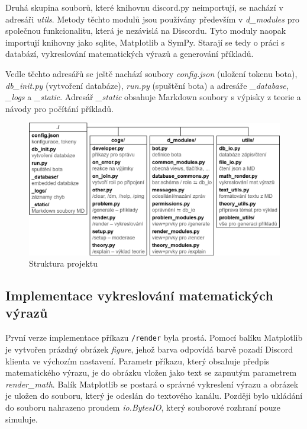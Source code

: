 \documentclass[FM]{tulthesis}
\begin{document}
	Druhá skupina souborů, které knihovnu discord.py neimportují, se nachází v adresáři \textit{utils}. Metody těchto modulů jsou používány především v \textit{d\_modules} pro společnou funkcionalitu, která je nezávislá na Discordu. Tyto moduly naopak importují knihovny jako sqlite, Matplotlib a SymPy. Starají se tedy o práci s databází, vykreslování matematických výrazů a generování příkladů. %
	
	Vedle těchto adresářů se ještě nachází soubory \textit{config.json} (uložení tokenu bota), \textit{db\_init.py} (vytvoření databáze), \textit{run.py} (spuštění bota) a adresáře \textit{\_database}, \textit{\_logs} a \textit{\_static}. Adresář \textit{\_static} obsahuje Markdown soubory s výpisky z teorie a návody pro počítání příkladů. %
	
	\begin{figure}[ht]
		\centering
		\includegraphics[width=\textwidth]{img/ProjectStructure}
		\caption{Struktura projektu}
	\end{figure}

	\subsection{Implementace vykreslování matematických výrazů}\label{_tag_section_approxtexlen}

	První verze implementace příkazu \verb|/render| byla prostá. Pomocí balíku Matplotlib je vytvořen prázdný obrázek \textit{figure}, jehož barva odpovídá barvě pozadí Discord klienta ve výchozím nastavení. Parametr příkazu, který obsahuje předpis matematického výrazu, je do obrázku vložen jako text se zapnutým parametrem \textit{render\_math}. Balík Matplotlib se postará o správné vykreslení výrazu a obrázek je uložen do souboru, který je odeslán do textového kanálu. Později bylo ukládání do souboru nahrazeno proudem \textit{io.BytesIO}, který souborové rozhraní pouze simuluje.
\end{document}
